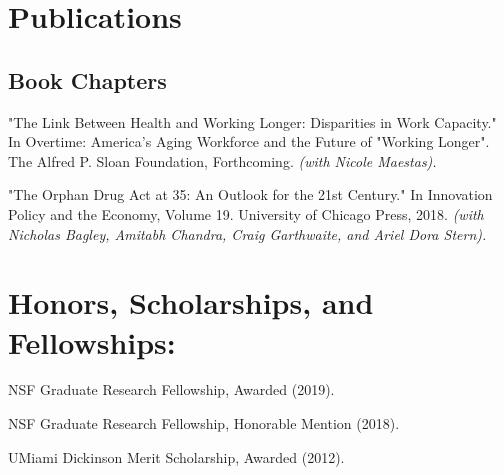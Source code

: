 \documentclass[letterpaper]{article}
\renewenvironment{itemize}{
  \begin{list}{}{
    \setlength{\leftmargin}{1.5em}
  }
}{
  \end{list}
}
\begin{document}
\section*{Publications}

\subsection*{Book Chapters}

\begin{itemize}
	\item "The Link Between Health and Working Longer: Disparities in Work Capacity." In Overtime: America's Aging Workforce and the Future of "Working Longer". The Alfred P. Sloan Foundation, Forthcoming. \textit{(with Nicole Maestas).}
\end{itemize}

\begin{itemize}
\item "The Orphan Drug Act at 35: An Outlook for the 21st Century." In Innovation Policy and the Economy, Volume 19. University of Chicago Press, 2018. \textit{(with Nicholas Bagley, Amitabh Chandra, Craig Garthwaite, and Ariel Dora Stern).}
\end{itemize}

\section*{Honors, Scholarships, and Fellowships:}
\begin{itemize}
\item NSF Graduate Research Fellowship, Awarded (2019).
\item NSF Graduate Research Fellowship, Honorable Mention (2018).
\item UMiami Dickinson Merit Scholarship, Awarded (2012).
\end{itemize}

%
\end{document}
